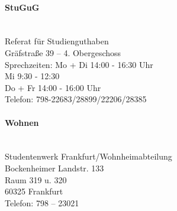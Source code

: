 \paragraph{StuGuG}~\\
Referat für Studienguthaben\\
Gräfstraße 39 – 4. Obergeschoss\\
Sprechzeiten: Mo + Di 14:00 - 16:30 Uhr\\
Mi 9:30 - 12:30\\
Do + Fr 14:00 - 16:00 Uhr\\
Telefon: 798-22683/28899/22206/28385\\

\paragraph{Wohnen}~\\
Studentenwerk Frankfurt/Wohnheimabteilung\\
Bockenheimer Landstr. 133\\
Raum 319 u. 320\\
60325 Frankfurt\\
Telefon: 798 – 23021\\

\spaltenende
